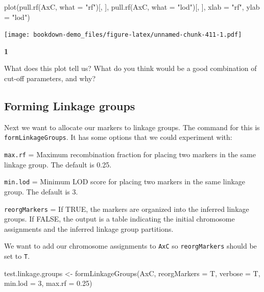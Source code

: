 \documentclass[
]{book}
\makeatletter
\newenvironment{Shaded}{\begin{snugshade}}{\end{snugshade}}
\newcommand{\AttributeTok}[1]{\textcolor[rgb]{0.77,0.63,0.00}{#1}}
\newcommand{\DecValTok}[1]{\textcolor[rgb]{0.00,0.00,0.81}{#1}}
\newcommand{\FloatTok}[1]{\textcolor[rgb]{0.00,0.00,0.81}{#1}}
\newcommand{\FunctionTok}[1]{\textcolor[rgb]{0.00,0.00,0.00}{#1}}
\newcommand{\NormalTok}[1]{#1}
\newcommand{\OtherTok}[1]{\textcolor[rgb]{0.56,0.35,0.01}{#1}}
\newcommand{\StringTok}[1]{\textcolor[rgb]{0.31,0.60,0.02}{#1}}
\newenvironment{kframe}{%
\medskip{}
\setlength{\fboxsep}{.8em}
 \def\at@end@of@kframe{}%
 \ifinner\ifhmode%
  \def\at@end@of@kframe{\end{minipage}}%
  \begin{minipage}{\columnwidth}%
 \fi\fi%
 \def\FrameCommand##1{\hskip\@totalleftmargin \hskip-\fboxsep
 \colorbox{shadecolor}{##1}\hskip-\fboxsep
     \hskip-\linewidth \hskip-\@totalleftmargin \hskip\columnwidth}%
 \MakeFramed {\advance\hsize-\width
   \@totalleftmargin\z@ \linewidth\hsize
   \@setminipage}}%
 {\par\unskip\endMakeFramed%
 \at@end@of@kframe}
\newenvironment{rmdblock}[1]
  {
  \begin{itemize}
  \renewcommand{\labelitemi}{
    \raisebox{-.7\height}[0pt][0pt]{
      {\setkeys{Gin}{width=3em,keepaspectratio}\texttt{[image: images/\#1]}}
    }
  }
  \setlength{\fboxsep}{1em}
  \begin{kframe}
  \item
  }
  {
  \end{kframe}
  \end{itemize}
  }
\newenvironment{rmdquiz}
  {\begin{rmdblock}{quiz}}
  {\end{rmdblock}}
\makeatother
\begin{document}
\begin{Shaded}
\begin{Highlighting}[]
\FunctionTok{plot}\NormalTok{(}\FunctionTok{pull.rf}\NormalTok{(AxC, }\AttributeTok{what =} \StringTok{"rf"}\NormalTok{)[, ], }\FunctionTok{pull.rf}\NormalTok{(AxC, }\AttributeTok{what =} \StringTok{"lod"}\NormalTok{)[, }
\NormalTok{    ], }\AttributeTok{xlab =} \StringTok{"rf"}\NormalTok{, }\AttributeTok{ylab =} \StringTok{"lod"}\NormalTok{)}
\end{Highlighting}
\end{Shaded}

\texttt{[image: bookdown-demo\_files/figure-latex/unnamed-chunk-411-1.pdf]}

\begin{rmdquiz}
\textbf{1}

What does this plot tell us? What do you think would be a good combination of cut-off parameters, and why?
\end{rmdquiz}

\hypertarget{forming-linkage-groups}{%
\subsection{Forming Linkage groups}\label{forming-linkage-groups}}

Next we want to allocate our markers to linkage groups. The command for this is \texttt{formLinkageGroups}. It has some options that we could experiment with:

\texttt{max.rf} = Maximum recombination fraction for placing two markers in the same linkage group. The default is 0.25.

\texttt{min.lod} = Minimum LOD score for placing two markers in the same linkage group. The default is 3.

\texttt{reorgMarkers} = If TRUE, the markers are organized into the inferred linkage groups. If FALSE, the output is a table indicating the initial chromosome assignments and the inferred linkage group partitions.

We want to add our chromosome assignments to \texttt{AxC} so \texttt{reorgMarkers} should be set to \texttt{T}.

\begin{Shaded}
\begin{Highlighting}[]
\NormalTok{test.linkage.groups }\OtherTok{\textless{}{-}} \FunctionTok{formLinkageGroups}\NormalTok{(AxC, }\AttributeTok{reorgMarkers =}\NormalTok{ T, }
    \AttributeTok{verbose =}\NormalTok{ T, }\AttributeTok{min.lod =} \DecValTok{3}\NormalTok{, }\AttributeTok{max.rf =} \FloatTok{0.25}\NormalTok{)}
\end{Highlighting}
\end{Shaded}
\end{document}
